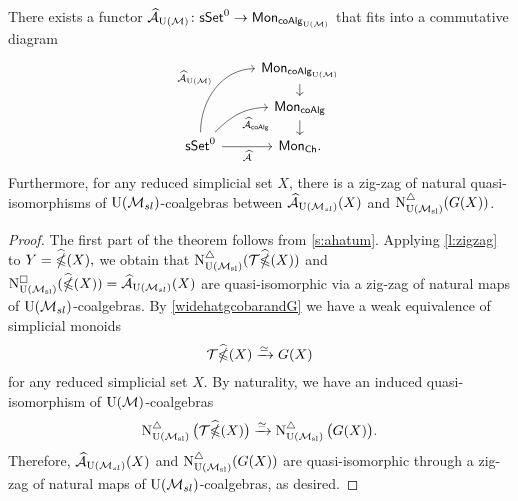\begin{nntheorem}
	There exists a functor $\Ahat_\UM \colon \sSet^0 \to \Mon_{\coAlg_\UM}$ that fits into a commutative diagram
	\begin{equation*}
	\begin{tikzcd}[row sep=small]
	& \Mon_{\coAlg_\UM} \arrow[d] \\
	& \Mon_{\coAlg} \arrow[d] \\
	\sSet^0
	\arrow[r, "\Ahat"', ]
	\arrow[ru, "\Ahat_{\coAlg}"', out=45, in=180] 
	\arrow[ruu, "\Ahat_\UM", out=90, in=180]
	& \Mon_{\Ch}.
	\end{tikzcd}
	\end{equation*}
	Furthermore, for any reduced simplicial set $X$, there is a zig-zag of natural quasi-isomorphisms of $\USL$-coalgebras between $\Ahat_\USL(X)$ and $\schainsUSL(G(X))$.
\end{nntheorem}

\begin{proof}
	The first part of the theorem follows from \cref{s:ahatum}.
	Applying \cref{l:zigzag} to $Y= \widehat{\ccobar}(X),$ we obtain that $\schainsUSL (\mathcal{T} \widehat{\ccobar}(X))$ and $\cchainsUSL(\widehat{\ccobar}(X)) = \Ahat_{\USL}(X)$ are quasi-isomorphic via a zig-zag of natural maps of $\USL$-coalgebras.
	By \cref{widehatgcobarandG} we have a weak equivalence of simplicial monoids
	\begin{equation*}
	\mathcal{T}\widehat{\ccobar}(X) \xrightarrow{\simeq} G(X)
	\end{equation*}
	for any reduced simplicial set $X$.
	By naturality, we have an induced quasi-isomorphism of $\UM$-coalgebras
	\begin{equation*}
	\schainsUSL \big( \mathcal{T}\widehat{\ccobar}(X) \big) \xra{\simeq}
	\schainsUSL \big( G(X) \big).
	\end{equation*}
	Therefore, $\Ahat_{\USL}(X)$ and $\schainsUSL(G(X))$ are quasi-isomorphic through a zig-zag of natural maps of $\USL$-coalgebras, as desired.
\end{proof}